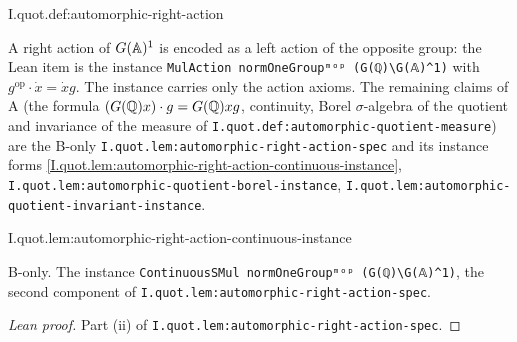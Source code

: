 \begin{definition}
\end{definition}
\begin{tfformal}{I.quot.def:automorphic-right-action}
\begin{tffidelity}
A right action of $G(\mathbb{A})^1$ is encoded as a left action of the opposite group: the Lean item is the instance \texttt{MulAction normOneGroupᵐᵒᵖ (G(ℚ)\textbackslash G(𝔸)\^{}1)} with $g^{\mathrm{op}}\cdot\dot x=\dot xg$. The instance carries only the action axioms. The remaining claims of A (the formula $(G(\mathbb{Q})x)\cdot g=G(\mathbb{Q})xg$, continuity, Borel $\sigma$-algebra of the quotient and invariance of the measure of \texttt{I.quot.def:automorphic-quotient-measure}) are the B-only \texttt{I.quot.lem:automorphic-right-action-spec} and its instance forms \cref{I.quot.lem:automorphic-right-action-continuous-instance}, \texttt{I.quot.lem:automorphic-quotient-borel-instance}, \texttt{I.quot.lem:automorphic-quotient-invariant-instance}.
\end{tffidelity}
\end{tfformal}

\begin{lemma}
\bonly
{}
\end{lemma}
\begin{tfformal}{I.quot.lem:automorphic-right-action-continuous-instance}
\begin{tffidelity}
B-only. The instance \texttt{ContinuousSMul normOneGroupᵐᵒᵖ (G(ℚ)\textbackslash G(𝔸)\^{}1)}, the second component of \texttt{I.quot.lem:automorphic-right-action-spec}.
\end{tffidelity}
\end{tfformal}
\begin{proof}[Lean proof]
Part (ii) of \texttt{I.quot.lem:automorphic-right-action-spec}.
\end{proof}

